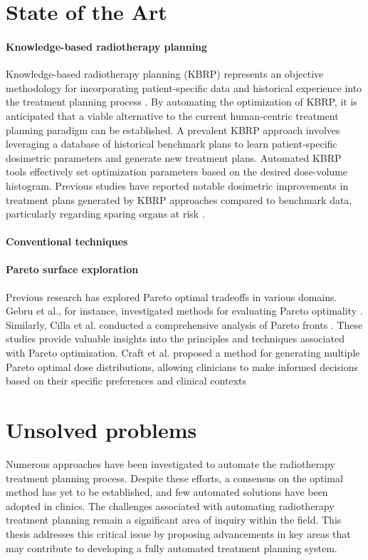 \section{State of the Art}
\paragraph{Knowledge-based radiotherapy planning}
Knowledge-based radiotherapy planning (KBRP) represents an objective methodology for incorporating patient-specific data and historical experience into the treatment planning process \cite{Nwankwo_2014}.
By automating the optimization of KBRP, it is anticipated that a viable alternative to the current human-centric treatment planning paradigm can be established.
A prevalent KBRP approach involves leveraging a database of historical benchmark plans to learn patient-specific dosimetric parameters and generate new treatment plans.
Automated KBRP tools effectively set optimization parameters based on the desired dose-volume histogram.
Previous studies have reported notable dosimetric improvements in treatment plans generated by KBRP approaches compared to benchmark data, particularly regarding sparing organs at risk \cite{Fogliata2014,Tol2015}.

\paragraph{Conventional techniques}

\paragraph{Pareto surface exploration}
Previous research has explored Pareto optimal tradeoffs in various domains.
Gebru et al., for instance, investigated methods for evaluating Pareto optimality \cite{Gebru2023}.
Similarly, Cilla et al. conducted a comprehensive analysis of Pareto fronts \cite{Cilla2018}.
These studies provide valuable insights into the principles and techniques associated with Pareto optimization.
Craft et al. proposed a method for generating multiple Pareto optimal dose distributions, allowing clinicians to make informed decisions based on their specific preferences and clinical contexts \cite{Craft2007}

\section{Unsolved problems}
Numerous approaches have been investigated to automate the radiotherapy treatment planning process.
Despite these efforts, a consensus on the optimal method has yet to be established, and few automated solutions have been adopted in clinics.
The challenges associated with automating radiotherapy treatment planning remain a significant area of inquiry within the field.
This thesis addresses this critical issue by proposing advancements in key areas that may contribute to developing a fully automated treatment planning system.

